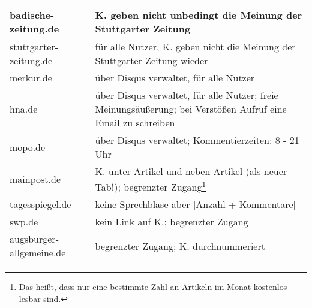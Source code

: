 \begin{longtable}{lp{10cm}}
badische-zeitung.de & K. geben nicht unbedingt die Meinung der Stuttgarter Zeitung
  \\\midrule

stuttgarter-zeitung.de &
  für alle Nutzer, K. geben nicht die Meinung der Stuttgarter Zeitung
  wieder\\\midrule

merkur.de &
  über Disqus verwaltet, für alle Nutzer\\\midrule

hna.de &
  über Disqus verwaltet, für alle Nutzer; freie Meinungsäußerung; bei Verstößen
  Aufruf eine Email zu schreiben \\\midrule

mopo.de &
  über Disqus verwaltet; Kommentierzeiten: 8 - 21 Uhr\\\midrule

mainpost.de &
  K. unter Artikel und neben Artikel (als neuer Tab!); begrenzter
  Zugang\footnote{Das heißt, dass nur eine bestimmte Zahl an Artikeln im Monat
  kostenlos lesbar sind.}\\\midrule

tagesspiegel.de &
  keine Sprechblase aber [Anzahl + Kommentare]\\\midrule

swp.de &
  kein Link auf K.; begrenzter Zugang\\\midrule

augsburger-allgemeine.de &
  begrenzter Zugang; K. durchnummeriert
\end{longtable}
\endgroup

